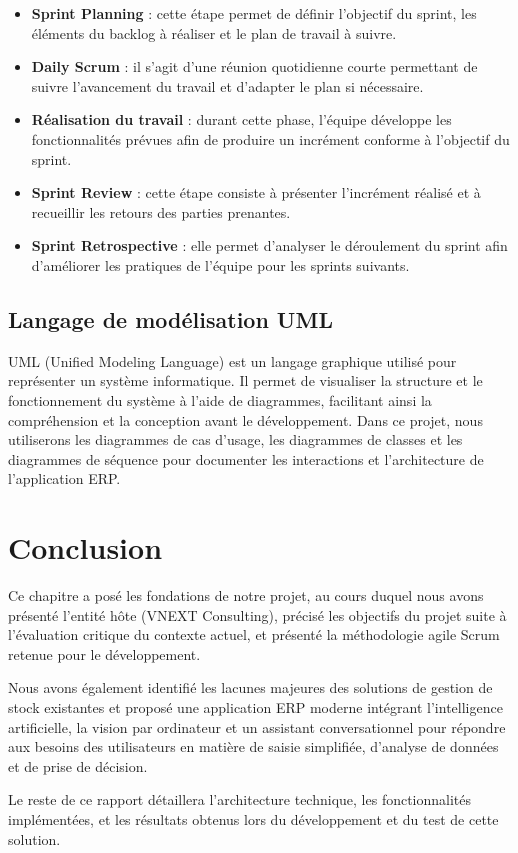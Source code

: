 \begin{itemize}
    \item \textbf{Sprint Planning} : cette étape permet de définir l'objectif du sprint, les éléments du backlog à réaliser et le plan de travail à suivre.
    \item \textbf{Daily Scrum} : il s'agit d'une réunion quotidienne courte permettant de suivre l'avancement du travail et d'adapter le plan si nécessaire.
    \item \textbf{Réalisation du travail} : durant cette phase, l'équipe développe les fonctionnalités prévues afin de produire un incrément conforme à l'objectif du sprint.
    \item \textbf{Sprint Review} : cette étape consiste à présenter l'incrément réalisé et à recueillir les retours des parties prenantes.
    \item \textbf{Sprint Retrospective} : elle permet d'analyser le déroulement du sprint afin d'améliorer les pratiques de l'équipe pour les sprints suivants.
\end{itemize}

\subsection{Langage de modélisation UML}

UML (Unified Modeling Language) est un langage graphique utilisé pour représenter un système informatique. Il permet de visualiser la structure et le fonctionnement du système à l'aide de diagrammes, facilitant ainsi la compréhension et la conception avant le développement. Dans ce projet, nous utiliserons les diagrammes de cas d'usage, les diagrammes de classes et les diagrammes de séquence pour documenter les interactions et l'architecture de l'application ERP.

\section{Conclusion}

Ce chapitre a posé les fondations de notre projet, au cours duquel nous avons présenté l'entité hôte (VNEXT Consulting), précisé les objectifs du projet suite à l'évaluation critique du contexte actuel, et présenté la méthodologie agile Scrum retenue pour le développement.

Nous avons également identifié les lacunes majeures des solutions de gestion de stock existantes et proposé une application ERP moderne intégrant l'intelligence artificielle, la vision par ordinateur et un assistant conversationnel pour répondre aux besoins des utilisateurs en matière de saisie simplifiée, d'analyse de données et de prise de décision.

Le reste de ce rapport détaillera l'architecture technique, les fonctionnalités implémentées, et les résultats obtenus lors du développement et du test de cette solution.
